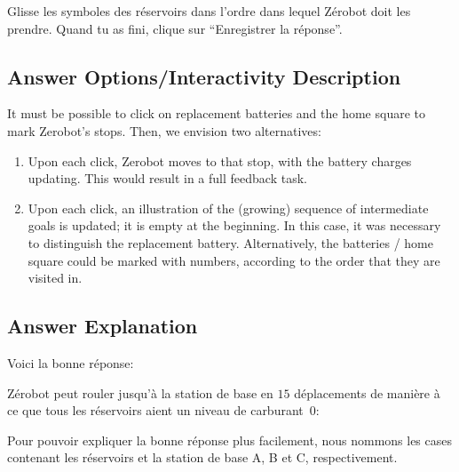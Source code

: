 \documentclass[a4paper,11pt]{report}
\newcommand{\taskGraphicsFolder}{..}
\begin{document}
Glisse les symboles des réservoirs dans l’ordre dans lequel Zérobot doit les prendre. Quand tu as fini, clique sur “Enregistrer la réponse”.

\begingroup
\renewcommand{\arraystretch}{1.5}
\subsection*{Answer Options/Interactivity Description}

It must be possible to click on replacement batteries and the home square to mark Zerobot’s stops. Then, we envision two alternatives:

\begin{enumerate}
  \item Upon each click, Zerobot moves to that stop, with the battery charges updating. This would result in a full feedback task.
  \item Upon each click, an illustration of the (growing) sequence of intermediate goals is updated; it is empty at the beginning. In this case, it was necessary to distinguish the replacement battery. Alternatively, the batteries / home square could be marked with numbers, according to the order that they are visited in.
\end{enumerate}

\endgroup

\subsection*{Answer Explanation}

Voici la bonne réponse:

{\centering%
\par}

Zérobot peut rouler jusqu’à la station de base en $15$ déplacements de manière à ce que tous les réservoirs aient un niveau de carburant~$0$:

{\centering%
\par}

Pour pouvoir expliquer la bonne réponse plus facilement, nous nommons les cases contenant les réservoirs et la station de base A, B et C, respectivement.
\end{document}
